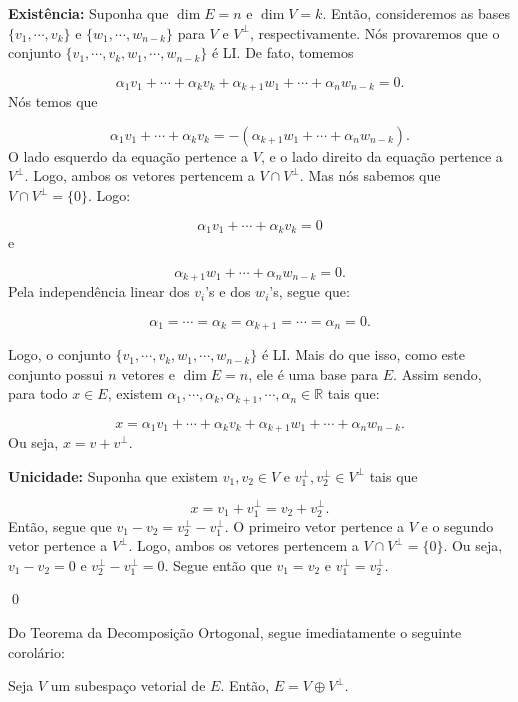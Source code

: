 \begin{Proof}
	\textbf{Existência:} Suponha que $\dim E = n$ e $\dim V = k$. Então, consideremos as bases $\{v_1, \cdots, v_k\}$ e $\{w_1, \cdots, w_{n - k}\}$ para $V$ e $V^\perp$, respectivamente. Nós provaremos que o conjunto $\{v_1, \cdots, v_k, w_1, \cdots, w_{n - k}\}$ é LI. De fato, tomemos
	
	$$
	\alpha_1v_1 + \cdots + \alpha_kv_k + \alpha_{k + 1}w_1 + \cdots + \alpha_nw_{n-k} = 0.
	$$ 
	Nós temos que
	
	$$
	\alpha_1v_1 + \cdots + \alpha_kv_k = -(\alpha_{k + 1}w_1 + \cdots + \alpha_nw_{n - k}).
	$$ 
	O lado esquerdo da equação pertence a $V$, e o lado direito da equação pertence a $V^\perp$. Logo, ambos os vetores pertencem a $V\cap V^\perp$. Mas nós sabemos que $V\cap V^\perp = \{0\}$. Logo:
	
	$$
	\alpha_1v_1 + \cdots + \alpha_kv_k = 0
	$$
	e
	
	$$
	\alpha_{k + 1}w_1 + \cdots + \alpha_nw_{n - k} = 0.
	$$
	Pela independência linear dos $v_i$'s e dos $w_i$'s, segue que:
	
	$$
	\alpha_1 = \cdots = \alpha_k = \alpha_{k + 1} = \cdots = \alpha_n = 0.
	$$
	
	Logo, o conjunto $\{v_1, \cdots, v_k, w_1, \cdots, w_{n - k}\}$ é LI. Mais do que isso, como este conjunto possui $n$ vetores e $\dim E = n$, ele é uma base para $E$. Assim sendo, para todo $x\in E$, existem $\alpha_1, \cdots, \alpha_k, \alpha_{k + 1}, \cdots, \alpha_n\in\mathbb{R}$ tais que:
	
	$$
	x = \alpha_1v_1 + \cdots + \alpha_kv_k + \alpha_{k + 1}w_1 + \cdots + \alpha_nw_{n - k}.
	$$
	Ou seja, $x = v + v^\perp$.
	
	\textbf{Unicidade:} Suponha que existem $v_1, v_2\in V$ e $v_1^\perp, v_2^\perp\in V^\perp$ tais que
	
	$$
	x = v_1 + v_1^\perp = v_2 + v_2^\perp.
	$$
	Então, segue que $v_1 - v_2 = v_2^\perp - v_1^\perp$. O primeiro vetor pertence a $V$ e o segundo vetor pertence a $V^\perp$. Logo, ambos os vetores pertencem a $V\cap V^\perp = \{0\}$. Ou seja, $v_1 - v_2 = 0$ e $v_2^\perp - v_1^\perp = 0$. Segue então que $v_1 = v_2$ e $v_1^\perp = v_2^\perp$.
	
	\qed
\end{Proof}

Do Teorema da Decomposição Ortogonal, segue imediatamente o seguinte corolário:

\begin{Corolary}
	Seja $V$ um subespaço vetorial de $E$. Então, $E = V\oplus V^\perp$.
\end{Corolary}

